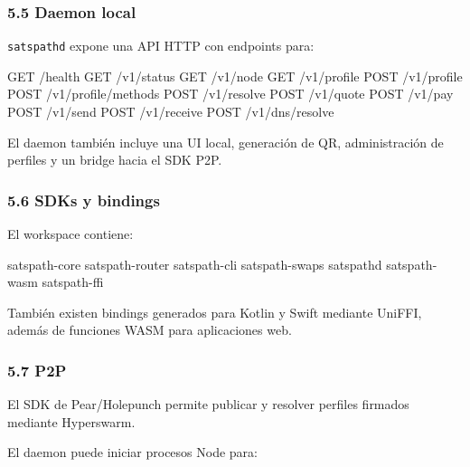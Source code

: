 \documentclass[
]{article}
\newenvironment{Shaded}{}{}
\newcommand{\NormalTok}[1]{#1}
\begin{document}
\hypertarget{daemon-local}{%
\subsubsection{5.5 Daemon local}\label{daemon-local}}

\texttt{satspathd} expone una API HTTP con endpoints para:

\begin{Shaded}
\begin{Highlighting}[]
\NormalTok{GET  /health}
\NormalTok{GET  /v1/status}
\NormalTok{GET  /v1/node}
\NormalTok{GET  /v1/profile}
\NormalTok{POST /v1/profile}
\NormalTok{POST /v1/profile/methods}
\NormalTok{POST /v1/resolve}
\NormalTok{POST /v1/quote}
\NormalTok{POST /v1/pay}
\NormalTok{POST /v1/send}
\NormalTok{POST /v1/receive}
\NormalTok{POST /v1/dns/resolve}
\end{Highlighting}
\end{Shaded}

El daemon también incluye una UI local, generación de QR, administración
de perfiles y un bridge hacia el SDK P2P.

\hypertarget{sdks-y-bindings}{%
\subsubsection{5.6 SDKs y bindings}\label{sdks-y-bindings}}

El workspace contiene:

\begin{Shaded}
\begin{Highlighting}[]
\NormalTok{satspath{-}core}
\NormalTok{satspath{-}router}
\NormalTok{satspath{-}cli}
\NormalTok{satspath{-}swaps}
\NormalTok{satspathd}
\NormalTok{satspath{-}wasm}
\NormalTok{satspath{-}ffi}
\end{Highlighting}
\end{Shaded}

También existen bindings generados para Kotlin y Swift mediante UniFFI,
además de funciones WASM para aplicaciones web.

\hypertarget{p2p}{%
\subsubsection{5.7 P2P}\label{p2p}}

El SDK de Pear/Holepunch permite publicar y resolver perfiles firmados
mediante Hyperswarm.

El daemon puede iniciar procesos Node para:
\end{document}
